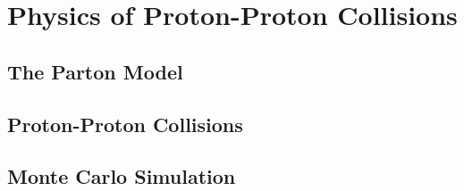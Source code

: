 \chapter{Physics of Proton-Proton Collisions}

\section{The Parton Model} \label{sec:pp_parton_model}


\section{Proton-Proton Collisions} \label{sec:pp_pp_collisions}


\section{Monte Carlo Simulation} \label{sec:pp_mc}

